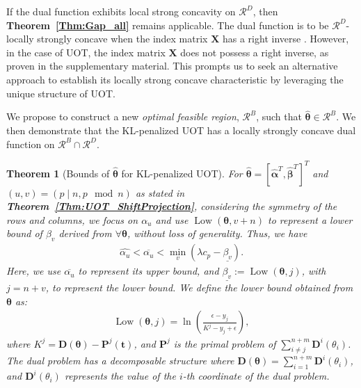 \documentclass[11pt]{article}
\newtheorem{thm}{Theorem}
\newcommand{\mat}[1]{\mathbf{#1}}
\renewcommand{\vec}[1]{\bm{#1}}
\begin{document}
If the dual function exhibits local strong concavity on $\mathcal{R}^{D}$, then {\bf Theorem~\ref{Thm:Gap_all}} remains applicable. The dual function is to be $\mathcal{R}^{D}$-locally strongly concave when the index matrix $\mat X$ has a right inverse \cite{Dantas_ICASSP_2021}. However, in the case of UOT, the index matrix $\mat X$ does not possess a right inverse, as proven in the supplementary material. This prompts us to seek an alternative approach to establish its locally strong concave characteristic by leveraging the unique structure of UOT.

We propose to construct a new {\it optimal feasible region}, $\mathcal{R}^{B}$, such that $ \hat{\vec\theta} \in \mathcal{R}^{B}$. We then demonstrate that the KL-penalized UOT has a locally strongly concave dual function on $\mathcal{R}^{B} \cap \mathcal{R}^{D}$.

\begin{thm}[Bounds of $\hat{\vec \theta}$ for KL-penalized UOT]
\label{Thm:kl_local}
For $\hat{\vec{\theta}} = [\hat{\vec{\alpha}}^T,\hat{\vec{\beta}}^T]^T$ and $(u,v)=(p \mid n,p \mod n)$ as stated in {\bf Theorem~\ref{Thm:UOT_ShiftProjection}}, considering the symmetry of the rows and columns, we focus on $\alpha_u$ and use $\operatorname{Low}(\vec \theta,v+n)$ to represent a lower bound of $\beta_v$ derived from $\forall \vec{\theta}$, without loss of generality. Thus, we have
\begin{equation*}
\begin{split}
\hat{\alpha_u} < \overline{\alpha_u}
< \min_v (\lambda c_p -\underline{\beta_v} ).
\end{split}
\end{equation*}
Here, we use $\overline{\alpha_u}$ to represent its upper bound, and $\underline{\beta_v} := \operatorname{Low}(\vec \theta, j)$, with $j = n+v$, to represent the lower bound. We define the lower bound obtained from $\vec\theta$ as:
\begin{equation*}
\begin{split}
\operatorname{Low}(\vec \theta, j) = \ln\left(\frac{\epsilon - y_j}{K^j - y_j +\epsilon}\right),
\end{split}
\end{equation*}
where $K^{j}= \mat D(\vec\theta) - \mat P^{j}({\vec t})$, and $\mat P^{j}$ is the primal problem of $\sum_{i\neq j}^{n+m} \mat D^{i}(\theta_i)$. The dual problem has a decomposable structure where $\mat D(\vec{\theta})=\sum_{i=1}^{n+m}\mat D^i(\theta_i)$, and $\mat D^i(\theta_i)$ represents the value of the $i$-th coordinate of the dual problem.
\end{thm}
\end{document}
